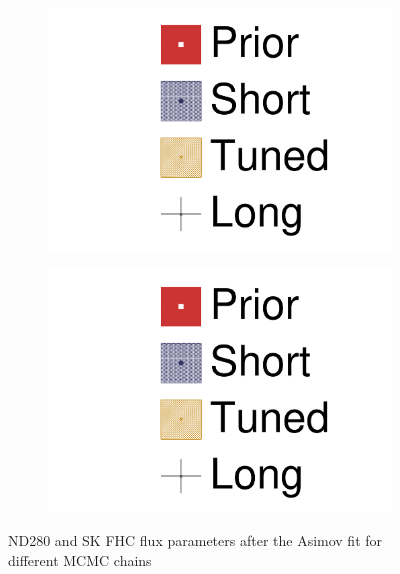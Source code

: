 \begin{figure}[h]
\begin{subfigure}[t]{0.24\textwidth}
	\includegraphics[width=\textwidth, trim={0mm 0mm 0mm 0mm}, clip,page=12]{figures/mach3/Asimov/2017_NewDet_Asimov_actually_0_2017b_NewDet_3Xsec_4Det_5Flux_NewXSecTune_Asimov_0_2017b_NewDet_NewData_Asimov_Long_0}
\end{subfigure}
\begin{subfigure}[t]{0.24\textwidth}
	\includegraphics[width=\textwidth, trim={0mm 0mm 0mm 0mm}, clip,page=13]{figures/mach3/Asimov/2017_NewDet_Asimov_actually_0_2017b_NewDet_3Xsec_4Det_5Flux_NewXSecTune_Asimov_0_2017b_NewDet_NewData_Asimov_Long_0}
\end{subfigure}
\caption{ND280 and SK FHC flux parameters after the Asimov fit for different MCMC chains}
\label{fig:flux_asimov_fhc}
\end{figure}

